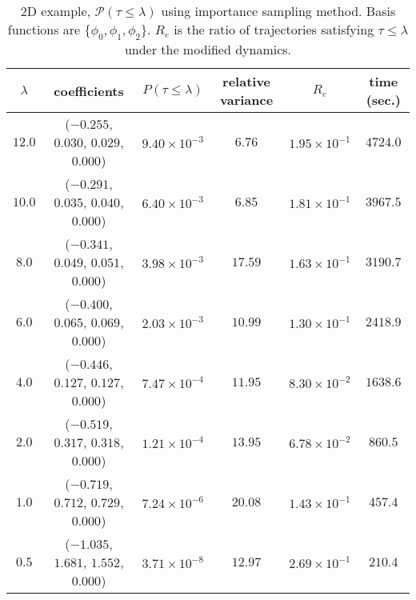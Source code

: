 \documentclass[final]{siamltex}
\begin{document}
\begin{table}
  \begin{tabular}{c|c|c|c|c|c}
    \hline
    $\lambda$ & coefficients & $P(\tau \le \lambda)$ & relative variance & $R_e$ & time (sec.) \\
    \hline
  $12.0$ & ($-0.255$,  $0.030$, $0.029$, $0.000$) & $9.40\times 10^{-3}$ & $6.76$ & $1.95\times 10^{-1}$ & $4724.0$ \\
    \hline
  $10.0$ & ($-0.291$,  $0.035$, $0.040$, $0.000$) & $6.40\times 10^{-3}$ & $6.85$ & $1.81\times 10^{-1}$ & $3967.5$ \\
    \hline
  $8.0$ & ($-0.341$,  $0.049$, $0.051$, $0.000$) & $3.98\times 10^{-3}$ & $17.59$ & $1.63\times 10^{-1}$ & $3190.7$ \\
    \hline
  $6.0$ & ($-0.400$,  $0.065$, $0.069$, $0.000$) & $2.03\times 10^{-3}$ & $10.99$ & $1.30\times 10^{-1}$ & $2418.9$ \\
    \hline
  $4.0$ & ($-0.446$,  $0.127$, $0.127$, $0.000$) & $7.47\times 10^{-4}$ & $11.95$ & $8.30\times 10^{-2}$ & $1638.6$ \\
    \hline
  $2.0$ & ($-0.519$,  $0.317$, $0.318$, $0.000$) & $1.21\times 10^{-4}$ & $13.95$ & $6.78\times 10^{-2}$ & $860.5$ \\
    \hline
  $1.0$ & ($-0.719$,  $0.712$, $0.729$, $0.000$) & $7.24\times 10^{-6}$ & $20.08$ & $1.43\times 10^{-1}$ & $457.4$ \\
    \hline
  $0.5$ & ($-1.035$,  $1.681$, $1.552$, $0.000$) & $3.71\times 10^{-8}$ & $12.97$ & $2.69\times 10^{-1}$ & $210.4$ \\
    \hline
  \end{tabular}
  \centering
  \caption{2D example, $\mathcal{P}(\tau \le \lambda)$ using importance
    sampling method. Basis functions are $\{\phi_0, \phi_1, \phi_2\}$. $R_e$ is the ratio of trajectories
satisfying $\tau \le \lambda$ under the modified dynamics. \label{tab-ex2-3}}
\end{table}
\end{document}
